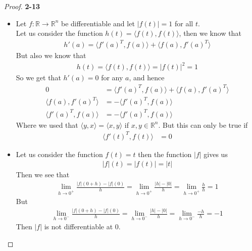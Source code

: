 \documentclass[11pt]{article}
\newcommand{\R}{\mathbb{R}}
\newcommand{\inprd}[1]{\langle #1\rangle}
\theoremstyle{definition}
\begin{document}
\begin{proof}{\textbf{2-13}}
\begin{itemize}
\cleardoublepage
\item [(c)] Let $f:\R \to \R^n$ be differentiable and let $|f(t)| = 1$ for all
$t$.\\
Let us consider the function $h(t) = \inprd{f(t), f(t)}$, then we know that
\begin{align*}
    h'(a) = \inprd{f'(a)^T, f(a)} + \inprd{f(a), f'(a)^T}
\end{align*}
But also we know that
\begin{align*}
    h(t) = \inprd{f(t), f(t)} = |f(t)|^2 = 1
\end{align*}
So we get that $h'(a) = 0$ for any $a$, and hence
\begin{align*}
    0 &= \inprd{f'(a)^T, f(a)} + \inprd{f(a), f'(a)^T}\\
    \inprd{f(a), f'(a)^T} &= -\inprd{f'(a)^T, f(a)}\\
    \inprd{f'(a)^T, f(a)} &= -\inprd{f'(a)^T, f(a)}
\end{align*}
Where we used that $\inprd{y,x} = \inprd{x,y}$ if $x,y \in \R^n$.
But this can only be true if
\begin{align*}
    \inprd{f'(t)^T, f(t)} &= 0
\end{align*}

\item [(d)] Let us consider the function $f(t) = t$ then the function $|f|$
gives us
\begin{align*}
    |f|(t) = |f(t)| = |t|
\end{align*}
Then we see that
\begin{align*}
    \lim_{h\to 0^+} \frac{|f|(0+ h) - |f|(0)}{h}
    = \lim_{h\to 0^+} \frac{|h| - |0|}{h} 
    = \lim_{h\to 0^+} \frac{h}{h} 
    = 1
\end{align*}
But
\begin{align*}
    \lim_{h\to 0^-} \frac{|f|(0+ h) - |f|(0)}{h}
    = \lim_{h\to 0^-} \frac{|h| - |0|}{h} 
    = \lim_{h\to 0^-} \frac{-h}{h} 
    = -1
\end{align*}
Then $|f|$ is not differentiable at 0.
\end{itemize}
\end{proof}
\end{document}
